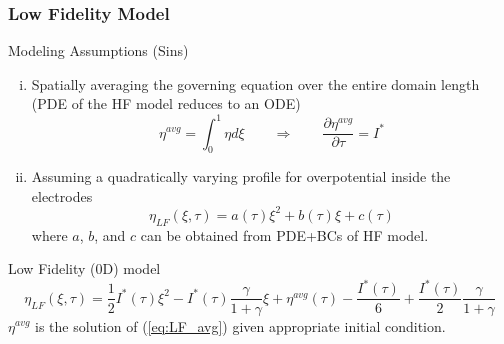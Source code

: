 \documentclass[10pt,xcolor=dvipsnames,compress]{beamer}
\begin{document}
\begin{frame}
\frametitle{Low Fidelity Model}
\vfill


\begin{alertblock}{Modeling Assumptions (Sins)}
\begin{enumerate}[i.]

\item Spatially
averaging the governing equation over the entire domain length (PDE of the HF model reduces to an ODE) 
%
\begin{equation}\label{eq:LF_avg}
\eta^{avg} = \int_0^1 \eta d\xi \qquad \Rightarrow \qquad
\frac{\partial{\eta}^{avg}}{\partial\tau} = I^*
\end{equation}

\item Assuming a quadratically varying profile for overpotential inside the electrodes
\begin{equation*}\label{eq:quadratic}
\eta_{LF} (\xi,\tau)= a(\tau)\xi^2 + b(\tau)\xi + c(\tau)
\end{equation*}
where $a$, $b$, and $c$ can be obtained from PDE+BCs of HF model.

\end{enumerate}
\end{alertblock}

\begin{block}{Low Fidelity (0D) model}
\begin{equation*}\label{eq:LF}
\eta_{LF}(\xi,\tau) = 
\frac{1}{2}I^*(\tau)\xi^2 - I^*(\tau) \frac{\gamma}{1+\gamma}\xi + {\eta}^{avg}(\tau) - \frac{I^*(\tau)}{6} + \frac{I^*(\tau)}{2}\frac{\gamma}{1+\gamma}
\end{equation*}
${\eta}^{avg}$ is the solution of (\ref{eq:LF_avg}) given appropriate initial condition.
\end{block}




\vfill
\end{frame}
\end{document}
